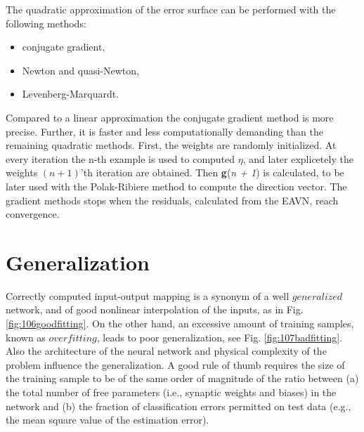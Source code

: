 
The quadratic approximation of the error surface can be performed with the
following methods:

\begin{itemize}
  \item{conjugate gradient,}
  \item{Newton and quasi-Newton,}
  \item{Levenberg-Marquardt.}
\end{itemize}

Compared to a linear approximation the conjugate gradient method is 
more precise. 
Further, it is faster and less computationally demanding than the
remaining quadratic methods.
First, the weights are randomly initialized. 
At every iteration the n-th example is used to computed $\eta$, and later
explicetely the weights $(n + 1)$'th iteration are obtained.
Then \textbf{g}(\textit{n + 1}) is calculated, to be later used with the
Polak-Ribiere method to compute the direction vector.
The gradient methods stops when the residuals, calculated from the
\acs{EAVN}, reach convergence.


\section{Generalization}
\label{sec:generalization}



Correctly computed input-output mapping is a synonym of a well $generalized$
network, and of good nonlinear interpolation of the inputs, as in Fig. 
\ref{fig:106goodfitting}. On the other hand, an excessive amount of
training samples, known as $overfitting$, leads to poor generalization, see 
Fig. \ref{fig:107badfitting}. Also the architecture of the neural network and
physical complexity of the problem influence the generalization.
A good rule of thumb requires the size of the training sample to be of the same
order of magnitude of the ratio between (a) the total number of free parameters 
(i.e., synaptic weights and biases) in the
network and (b) the fraction of classification errors permitted on test
data (e.g., the mean square value of the estimation error).


